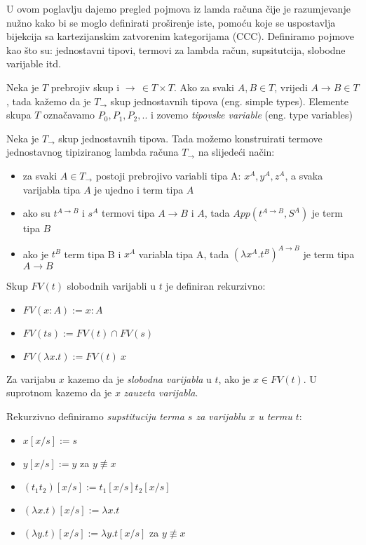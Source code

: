 U ovom poglavlju dajemo pregled pojmova iz lamda računa čije je razumjevanje nužno kako bi se moglo definirati proširenje iste, pomoću koje se uspostavlja bijekcija sa kartezijanskim zatvorenim kategorijama (CCC). Definiramo pojmove kao što su: jednostavni tipovi, termovi za lambda račun, supsitutcija, slobodne varijable itd.

\begin{definition}
  Neka je $T$ prebrojiv skup i $\to \, \in T \times T$.
    Ako za svaki $A, B \in T$, vrijedi $A \to B \in T$, tada kažemo da je $T_{\to}$ skup jednostavnih tipova (eng. simple types). Elemente skupa $T$ označavamo $P_0, P_1, P_2, ..$ i zovemo \emph{tipovske variable} (eng. type variables)
\end{definition}



\begin{definition}
  Neka je $T_\to$ skup jednostavnih tipova. Tada možemo konstruirati termove jednostavnog tipiziranog lambda računa $T_\to$ na slijedeći način:
  \begin{itemize}
    \item za svaki $A \in T_\to$ postoji prebrojivo variabli tipa A: $x^A, y^A, z^A$, a svaka varijabla tipa $A$ je ujedno i term tipa $A$
    \item ako su $t^{A \to B}$ i $s^A$ termovi tipa $A \to B$ i $A$, tada $App(t^{A \to B}, S^A)$ je term tipa $B$
    \item ako je $t^B$ term tipa B i $x^A$ variabla tipa A, tada $(\lambda x^A . t^B)^{A \to B}$ je term tipa ${A \to B}$
  \end{itemize}
\end{definition}

\begin{definition}
  Skup $FV(t)$ slobodnih varijabli u $t$ je definiran rekurzivno:
  \begin{itemize}
    \item $FV(x : A) := x : A$
    \item $FV(ts) := FV(t) \cap FV(s)$
    \item $FV(\lambda x . t) := FV(t) \ {x}$
  \end{itemize}
  Za varijabu $x$ kazemo da je \emph{slobodna varijabla} u $t$, ako je $x \in FV(t)$. U suprotnom kazemo da je $x$ \emph{zauzeta varijabla}.
\end{definition}

\begin{definition}[Supstitucija]
  Rekurzivno definiramo \emph{supstituciju terma $s$ za varijablu $x$ u termu $t$}:
  \begin{itemize}
    \item $x[x/s] := s$
    \item $y[x/s] := y$ za $y \not\equiv x$
    \item $(t_1t_2)[x/s] := t_1[x/s]t_2[x/s]$
    \item $(\lambda x . t)[x / s] := \lambda x . t$
    \item $(\lambda y . t)[x / s] := \lambda y . t[x/s]$ za $y \not\equiv x$
  \end{itemize}
\end{definition}

